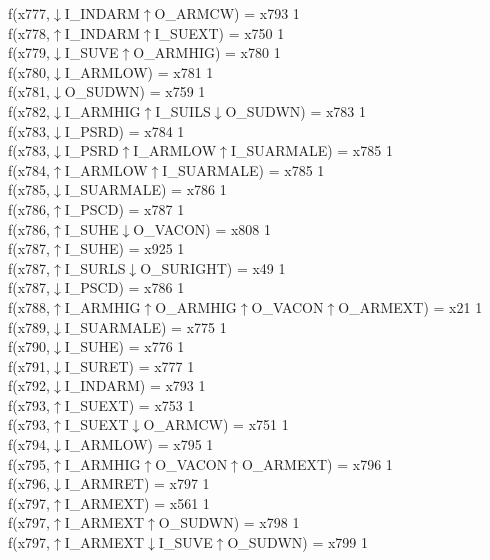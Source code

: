 f(x777,$\downarrow$I\_INDARM$\uparrow$O\_ARMCW) = x793 {1} \\
f(x778,$\uparrow$I\_INDARM$\uparrow$I\_SUEXT) = x750 {1} \\
f(x779,$\downarrow$I\_SUVE$\uparrow$O\_ARMHIG) = x780 {1} \\
f(x780,$\downarrow$I\_ARMLOW) = x781 {1} \\
f(x781,$\downarrow$O\_SUDWN) = x759 {1} \\
f(x782,$\downarrow$I\_ARMHIG$\uparrow$I\_SUILS$\downarrow$O\_SUDWN) = x783 {1} \\
f(x783,$\downarrow$I\_PSRD) = x784 {1} \\
f(x783,$\downarrow$I\_PSRD$\uparrow$I\_ARMLOW$\uparrow$I\_SUARMALE) = x785 {1} \\
f(x784,$\uparrow$I\_ARMLOW$\uparrow$I\_SUARMALE) = x785 {1} \\
f(x785,$\downarrow$I\_SUARMALE) = x786 {1} \\
f(x786,$\uparrow$I\_PSCD) = x787 {1} \\
f(x786,$\uparrow$I\_SUHE$\downarrow$O\_VACON) = x808 {1} \\
f(x787,$\uparrow$I\_SUHE) = x925 {1} \\
f(x787,$\uparrow$I\_SURLS$\downarrow$O\_SURIGHT) = x49 {1} \\
f(x787,$\downarrow$I\_PSCD) = x786 {1} \\
f(x788,$\uparrow$I\_ARMHIG$\uparrow$O\_ARMHIG$\uparrow$O\_VACON$\uparrow$O\_ARMEXT) = x21 {1} \\
f(x789,$\downarrow$I\_SUARMALE) = x775 {1} \\
f(x790,$\downarrow$I\_SUHE) = x776 {1} \\
f(x791,$\downarrow$I\_SURET) = x777 {1} \\
f(x792,$\downarrow$I\_INDARM) = x793 {1} \\
f(x793,$\uparrow$I\_SUEXT) = x753 {1} \\
f(x793,$\uparrow$I\_SUEXT$\downarrow$O\_ARMCW) = x751 {1} \\
f(x794,$\downarrow$I\_ARMLOW) = x795 {1} \\
f(x795,$\uparrow$I\_ARMHIG$\uparrow$O\_VACON$\uparrow$O\_ARMEXT) = x796 {1} \\
f(x796,$\downarrow$I\_ARMRET) = x797 {1} \\
f(x797,$\uparrow$I\_ARMEXT) = x561 {1} \\
f(x797,$\uparrow$I\_ARMEXT$\uparrow$O\_SUDWN) = x798 {1} \\
f(x797,$\uparrow$I\_ARMEXT$\downarrow$I\_SUVE$\uparrow$O\_SUDWN) = x799 {1} \\
